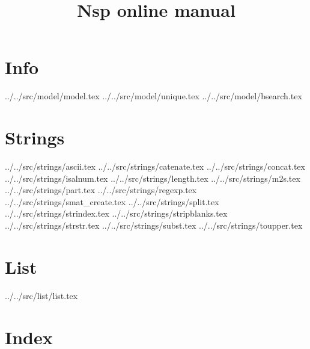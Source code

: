 \documentclass[11pt]{book}
\title{Nsp online manual}
\def\dir{../}
\begin{document}
\maketitle

\tableofcontents

\chapter{Info}

 \dir ../src/model/model.tex 
 \dir ../src/model/unique.tex 
 \dir ../src/model/bsearch.tex 

\chapter{Strings}

 \dir ../src/strings/ascii.tex
 \dir ../src/strings/catenate.tex
 \dir ../src/strings/concat.tex
 \dir ../src/strings/isalnum.tex
 \dir ../src/strings/length.tex
 \dir ../src/strings/m2s.tex
 \dir ../src/strings/part.tex
 \dir ../src/strings/regexp.tex
 \dir ../src/strings/smat_create.tex
 \dir ../src/strings/split.tex
 \dir ../src/strings/strindex.tex
 \dir ../src/strings/stripblanks.tex
 \dir ../src/strings/strstr.tex
 \dir ../src/strings/subst.tex
 \dir ../src/strings/toupper.tex


\chapter{List}

 \dir ../src/list/list.tex 

\chapter{Index}

\printindex
\end{document}
